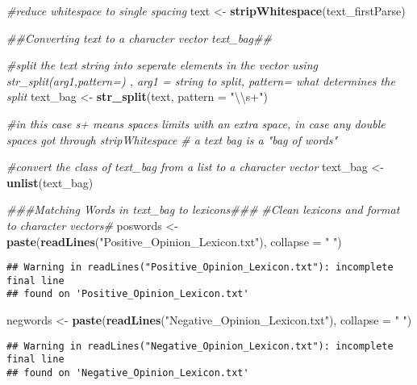 \documentclass[]{article}
\newenvironment{Shaded}{\begin{snugshade}}{\end{snugshade}}
\newcommand{\CharTok}[1]{\textcolor[rgb]{0.31,0.60,0.02}{#1}}
\newcommand{\CommentTok}[1]{\textcolor[rgb]{0.56,0.35,0.01}{\textit{#1}}}
\newcommand{\DataTypeTok}[1]{\textcolor[rgb]{0.13,0.29,0.53}{#1}}
\newcommand{\KeywordTok}[1]{\textcolor[rgb]{0.13,0.29,0.53}{\textbf{#1}}}
\newcommand{\NormalTok}[1]{#1}
\newcommand{\StringTok}[1]{\textcolor[rgb]{0.31,0.60,0.02}{#1}}
\begin{document}
\begin{Shaded}
\begin{Highlighting}[]
\CommentTok{#reduce whitespace to single spacing}
\NormalTok{text <-}\StringTok{ }\KeywordTok{stripWhitespace}\NormalTok{(text_firstParse)}

\CommentTok{##Converting text to a character vector text_bag##}

\CommentTok{#split the text string into seperate elements in the vector using str_split(arg1,pattern=) , arg1 = string to split, pattern= what determines the split}
\NormalTok{text_bag <-}\StringTok{ }\KeywordTok{str_split}\NormalTok{(text, }\DataTypeTok{pattern =} \StringTok{"}\CharTok{\textbackslash{}\textbackslash{}}\StringTok{s+"}\NormalTok{) }

\CommentTok{#in this case s+ means spaces limits with an extra space, in case any double spaces got through stripWhitespace}
\CommentTok{# a text bag is a "bag of words"}

\CommentTok{#convert the class of text_bag from a list to a character vector}
\NormalTok{text_bag <-}\StringTok{ }\KeywordTok{unlist}\NormalTok{(text_bag)}


\CommentTok{###Matching Words in text_bag to lexicons###}
\CommentTok{#Clean lexicons and format to character vectors#}
\NormalTok{poswords <-}\StringTok{  }\KeywordTok{paste}\NormalTok{(}\KeywordTok{readLines}\NormalTok{(}\StringTok{"Positive_Opinion_Lexicon.txt"}\NormalTok{), }\DataTypeTok{collapse =} \StringTok{" "}\NormalTok{)}
\end{Highlighting}
\end{Shaded}

\begin{verbatim}
## Warning in readLines("Positive_Opinion_Lexicon.txt"): incomplete final line
## found on 'Positive_Opinion_Lexicon.txt'
\end{verbatim}

\begin{Shaded}
\begin{Highlighting}[]
\NormalTok{negwords <-}\StringTok{  }\KeywordTok{paste}\NormalTok{(}\KeywordTok{readLines}\NormalTok{(}\StringTok{"Negative_Opinion_Lexicon.txt"}\NormalTok{), }\DataTypeTok{collapse =} \StringTok{" "}\NormalTok{)}
\end{Highlighting}
\end{Shaded}

\begin{verbatim}
## Warning in readLines("Negative_Opinion_Lexicon.txt"): incomplete final line
## found on 'Negative_Opinion_Lexicon.txt'
\end{verbatim}
\end{document}
